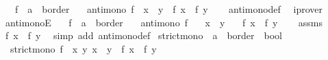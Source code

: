 \begin{isabellebody}
\ \ \ f\ {\isacharcolon}{\kern0pt}{\isacharcolon}{\kern0pt}\ {\isachardoublequoteopen}{\isacharprime}{\kern0pt}a\ {\isasymRightarrow}\ {\isacharprime}{\kern0pt}b{\isacharcolon}{\kern0pt}{\isacharcolon}{\kern0pt}order{\isachardoublequoteclose}\isanewline
\ \ \ {\isachardoublequoteopen}antimono\ f\ {\isasymLongrightarrow}\ x\ {\isasymle}\ y\ {\isasymLongrightarrow}\ f\ x\ {\isasymge}\ f\ y{\isachardoublequoteclose}\isanewline
%
\isadelimproof
\ \ %
\endisadelimproof
%
\isatagproof
{}\isamarkupfalse%
\ antimono{\isacharunderscore}{\kern0pt}def\ \isamarkupfalse%
\ iprover%
\endisatagproof
{\isafoldproof}%
%
\isadelimproof
\isanewline
%
\endisadelimproof
\isanewline
{}\isamarkupfalse%
\ antimonoE{\isacharcolon}{\kern0pt}\isanewline
\ \ \ f\ {\isacharcolon}{\kern0pt}{\isacharcolon}{\kern0pt}\ {\isachardoublequoteopen}{\isacharprime}{\kern0pt}a\ {\isasymRightarrow}\ {\isacharprime}{\kern0pt}b{\isacharcolon}{\kern0pt}{\isacharcolon}{\kern0pt}order{\isachardoublequoteclose}\isanewline
\ \ \ {\isachardoublequoteopen}antimono\ f{\isachardoublequoteclose}\isanewline
\ \ \ {\isachardoublequoteopen}x\ {\isasymle}\ y{\isachardoublequoteclose}\isanewline
\ \ \ {\isachardoublequoteopen}f\ x\ {\isasymge}\ f\ y{\isachardoublequoteclose}\isanewline
%
\isadelimproof
%
\endisadelimproof
%
\isatagproof
{}\isamarkupfalse%
\isanewline
\ \ \isamarkupfalse%
\ assms\ \isamarkupfalse%
\ {\isachardoublequoteopen}f\ x\ {\isasymge}\ f\ y{\isachardoublequoteclose}\ \isamarkupfalse%
\ {\isacharparenleft}{\kern0pt}simp\ add{\isacharcolon}{\kern0pt}\ antimono{\isacharunderscore}{\kern0pt}def{\isacharparenright}{\kern0pt}\isanewline
{}\isamarkupfalse%
%
\endisatagproof
{\isafoldproof}%
%
\isadelimproof
\isanewline
%
\endisadelimproof
\isanewline
{}\isamarkupfalse%
\ strict{\isacharunderscore}{\kern0pt}mono\ {\isacharcolon}{\kern0pt}{\isacharcolon}{\kern0pt}\ {\isachardoublequoteopen}{\isacharparenleft}{\kern0pt}{\isacharprime}{\kern0pt}a\ {\isasymRightarrow}\ {\isacharprime}{\kern0pt}b{\isacharcolon}{\kern0pt}{\isacharcolon}{\kern0pt}order{\isacharparenright}{\kern0pt}\ {\isasymRightarrow}\ bool{\isachardoublequoteclose}\ \isanewline
\ \ {\isachardoublequoteopen}strict{\isacharunderscore}{\kern0pt}mono\ f\ {\isasymlongleftrightarrow}\ {\isacharparenleft}{\kern0pt}{\isasymforall}x\ y{\isachardot}{\kern0pt}\ x\ {\isacharless}{\kern0pt}\ y\ {\isasymlongrightarrow}\ f\ x\ {\isacharless}{\kern0pt}\ f\ y{\isacharparenright}{\kern0pt}{\isachardoublequoteclose}\isanewline

\end{isabellebody}

